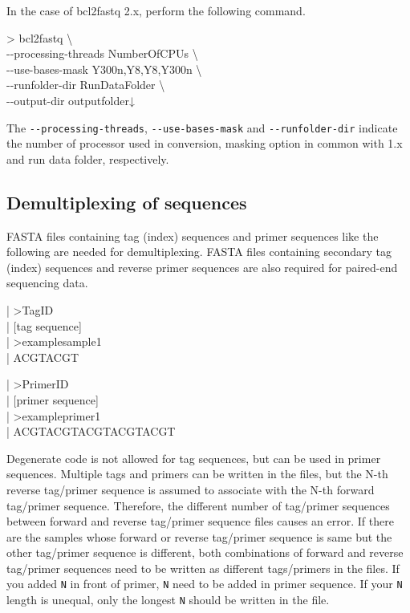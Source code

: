 \documentclass[titlepage,10pt,a4paper,english]{jsbook}
\newenvironment{content}{\begin{shaded}\vspace{-1em}\raggedright\ttfamily\footnotesize\setlength{\baselineskip}{1.4em}}{\end{shaded}\vspace{-1em}}
\newenvironment{cmd}{\begin{oframed}\raggedright\ttfamily\footnotesize\setlength{\baselineskip}{1.4em}}{\end{oframed}\vspace{-1em}}
\begin{document}
In the case of bcl2fastq 2.x, perform the following command.
\begin{cmd}
{\textgreater} bcl2fastq {\textbackslash}\\
{-}{-}processing-threads NumberOfCPUs {\textbackslash}\\
{-}{-}use-bases-mask Y300n,Y8,Y8,Y300n {\textbackslash}\\
{-}{-}runfolder-dir RunDataFolder {\textbackslash}\\
{-}{-}output-dir outputfolder↓
\end{cmd}
The \texttt{{-}{-}processing-threads}, \texttt{{-}{-}use-bases-mask} and \texttt{{-}{-}runfolder-dir} indicate the number of processor used in conversion, masking option in common with 1.x and run data folder, respectively.

\subsection{Demultiplexing of sequences}

FASTA files containing tag (index) sequences and primer sequences like the following are needed for demultiplexing.
FASTA files containing secondary tag (index) sequences and reverse primer sequences are also required for paired-end sequencing data.
\begin{content}
| {\textgreater}TagID\\
| [tag sequence]\\
| {\textgreater}examplesample1\\
| ACGTACGT
\end{content}
\begin{content}
| {\textgreater}PrimerID\\
| [primer sequence]\\
| {\textgreater}exampleprimer1\\
| ACGTACGTACGTACGTACGT
\end{content}
Degenerate code is not allowed for tag sequences, but can be used in primer sequences.
Multiple tags and primers can be written in the files, but the N-th reverse tag/primer sequence is assumed to associate with the N-th forward tag/primer sequence.
Therefore, the different number of tag/primer sequences between forward and reverse tag/primer sequence files causes an error.
If there are the samples whose forward or reverse tag/primer sequence is same but the other tag/primer sequence is different, both combinations of forward and reverse tag/primer sequences need to be written as different tags/primers in the files.
If you added \texttt{N} in front of primer, \texttt{N} need to be added in primer sequence.
If your \texttt{N} length is unequal, only the longest \texttt{N} should be written in the file.
\end{document}
